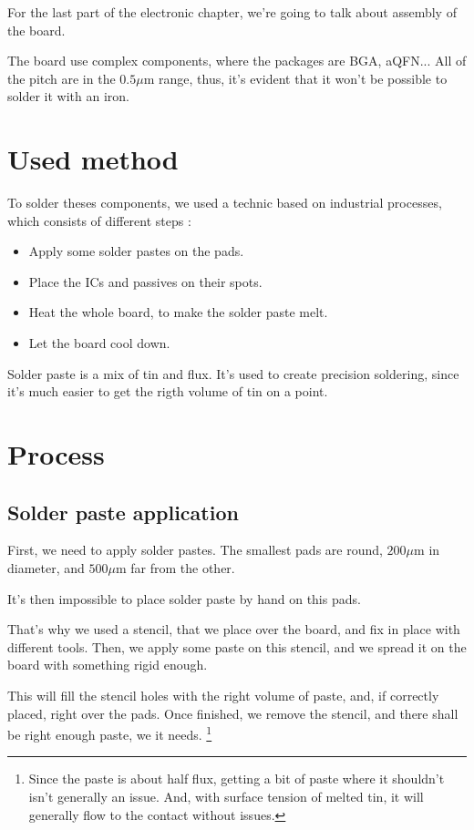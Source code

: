 For the last part of the electronic chapter, we're going to talk about 
assembly of the board.

The board use complex components, where the packages are BGA, aQFN...
All of the pitch are in the $0.5 \si{\mu\meter}$ range, thus, it's 
evident that it won't be possible to solder it with an iron.

\section{Used method}
To solder theses components, we used a technic based on industrial
processes, which consists of different steps : 

\begin{itemize}
    \item   Apply some solder pastes on the pads.
    \item   Place the ICs and passives on their spots.
    \item   Heat the whole board, to make the solder paste melt.
    \item   Let the board cool down.
\end{itemize}

Solder paste is a mix of tin and flux. It's used to create precision 
soldering, since it's much easier to get the rigth volume of tin on a
point.

\section{Process}
\subsection{Solder paste application}
First, we need to apply solder pastes. The smallest pads are round,
$200 \si{\mu\meter}$ in diameter, and $500 \si{\mu\meter}$ far from the
other.

It's then impossible to place solder paste by hand on this pads.

That's why we used a stencil, that we place over the board, and fix in
place with different tools. Then, we apply some paste on this stencil, and 
we spread it on the board with something rigid enough.

This will fill the stencil holes with the right volume of paste, and, if 
correctly placed, right over the pads. Once finished, we remove the stencil, 
and there shall be right enough paste, we it needs. \footnote{
    Since the paste is about half flux, getting a bit of paste where it shouldn't 
    isn't generally an issue. And, with surface tension of melted tin, it will
    generally flow to the contact without issues.
}

